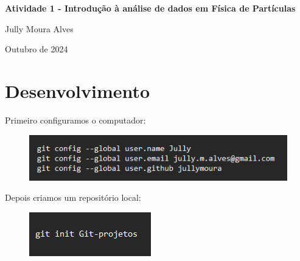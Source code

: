 \documentclass{article}
\begin{document}
\begin{titlepage}
      \centering
      \vspace*{1cm}
    
     \Huge
     \textbf{Atividade 1 - Introdução à análise de dados em Física de Partículas}

     \vspace{0.5cm}
    
     \Large 
      Jully Moura Alves

     \vfill
    
     \Large
      Outubro de 2024
    \end{titlepage}

    \newpage
    \section*{Desenvolvimento}
    
    \vspace{0.5cm}

    Primeiro configuramos o computador:

    \vspace{0.5cm}

    \begin{figure}[hb]
        \centering
        \includegraphics[width=1\linewidth]{global.png}
    \end{figure}

    \vspace{0.5cm}

    Depois criamos um repositório local:

    \vspace{0.5cm}

    \begin{figure}[hb]
        \centering
        \includegraphics[width=0.4\linewidth]{init.png}
        \label{fig:enter-label}
    \end{figure}

    \vspace{0.5cm}
\end{document}
